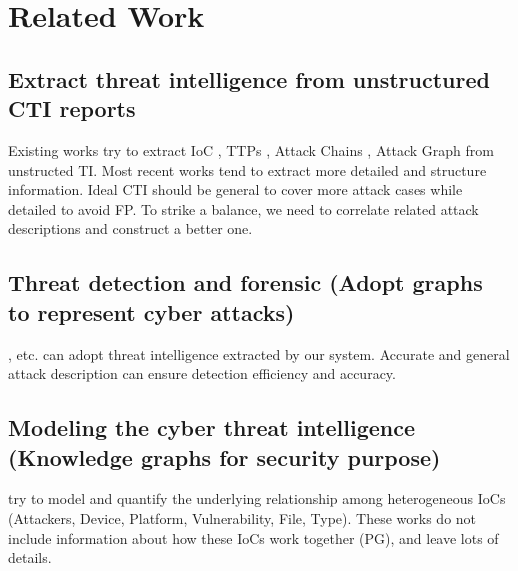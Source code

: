 \section{Related Work}
\label{sec:relatedworks}

\subsection{Extract threat intelligence from unstructured CTI reports}

Existing works try to extract IoC \cite{Liao}, TTPs \cite{Husari2017}, Attack Chains \cite{Zhu2018}, Attack Graph \cite{Gao} from unstructed TI. Most recent works tend to extract more detailed and structure information. Ideal CTI should be general to cover more attack cases while detailed to avoid FP.  To strike a balance, we need to correlate related attack descriptions and construct a better one. 

\subsection{Threat detection and forensic (Adopt graphs to represent cyber attacks)}

\cite{Milajerdi2019}, etc. can adopt threat intelligence extracted by our system. Accurate and general attack description can ensure detection efficiency and accuracy. 

\subsection{Modeling the cyber threat intelligence (Knowledge graphs for security purpose)}

\cite{Gao2020,Zhao2020} try to model and quantify the underlying relationship among heterogeneous IoCs (Attackers, Device, Platform, Vulnerability, File, Type). These works do not include information about how these IoCs work together (PG), and leave lots of details. 

